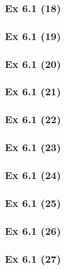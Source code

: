 \subsubsection{Ex 6.1 (18)}\label{sec:Ex_6.1.18}

\subsubsection{Ex 6.1 (19)}\label{sec:Ex_6.1.19}

\subsubsection{Ex 6.1 (20)}\label{sec:Ex_6.1.20}

\newpage		%

\subsubsection{Ex 6.1 (21)}\label{sec:Ex_6.1.21}

\subsubsection{Ex 6.1 (22)}\label{sec:Ex_6.1.22}

\subsubsection{Ex 6.1 (23)}\label{sec:Ex_6.1.23}

\subsubsection{Ex 6.1 (24)}\label{sec:Ex_6.1.24}

\subsubsection{Ex 6.1 (25)}\label{sec:Ex_6.1.25}

\subsubsection{Ex 6.1 (26)}\label{sec:Ex_6.1.26}

\subsubsection{Ex 6.1 (27)}\label{sec:Ex_6.1.27}


